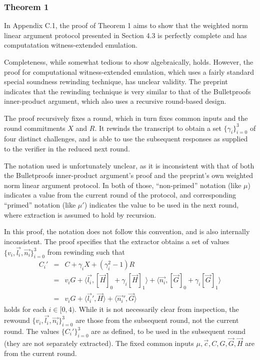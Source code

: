 \documentclass{article}
\begin{document}
\subsubsection{Theorem 1}

In Appendix C.1, the proof of Theorem 1 aims to show that the weighted norm linear argument protocol presented in Section 4.3 is perfectly complete and has computatation witness-extended emulation.

Completeness, while somewhat tedious to show algebraically, holds.
However, the proof for computational witness-extended emulation, which uses a fairly standard special soundness rewinding technique, has unclear validity.
The preprint indicates that the rewinding technique is very similar to that of the Bulletproofs inner-product argument, which also uses a recursive round-based design.

The proof recursively fixes a round, which in turn fixes common inputs and the round commitments $X$ and $R$.
It rewinds the transcript to obtain a set $\{\gamma_i\}_{i=0}^3$ of four distinct challenges, and is able to use the subsequent responses as supplied to the verifier in the reduced next round.

The notation used is unfortunately unclear, as it is inconsistent with that of both the Bulletproofs inner-product argument's proof and the preprint's own weighted norm linear argument protocol.
In both of those, ``non-primed'' notation (like $\mu$) indicates a value from the current round of the protocol, and corresponding ``primed'' notation (like $\mu'$) indicates the value to be used in the next round, where extraction is assumed to hold by recursion.

In this proof, the notation does not follow this convention, and is also internally inconsistent.
The proof specifies that the extractor obtains a set of values $\{v_i, \vec{l_i}, \vec{n_i}\}_{i=0}^3$ from rewinding such that
\begin{eqnarray*}
	C_i' &=& C + \gamma_i X + (\gamma_i^2 - 1) R \\
	&=& v_i G + \langle \vec{l_i}, [\vec{H}]_0 + \gamma_i [\vec{H}]_1 \rangle + \langle \vec{n_i}, [\vec{G}]_0 + \gamma_i [\vec{G}]_1 \rangle \\
	&=& v_i G + \langle \vec{l_i}', \vec{H} \rangle + \langle \vec{n_i}', \vec{G} \rangle
\end{eqnarray*}
holds for each $i \in [0, 4)$.
While it is not necessarily clear from inspection, the rewound $\{v_i, \vec{l_i}, \vec{n_i}\}_{i=0}^3$ are those from the subsequent round, not the current round.
The values $\{C_i'\}_{i=0}^3$ are as defined, to be used in the subsequent round (they are not separately extracted).
The fixed common inputs $\mu, \vec{c}, C, G, \vec{G}, \vec{H}$ are from the current round.
\end{document}
